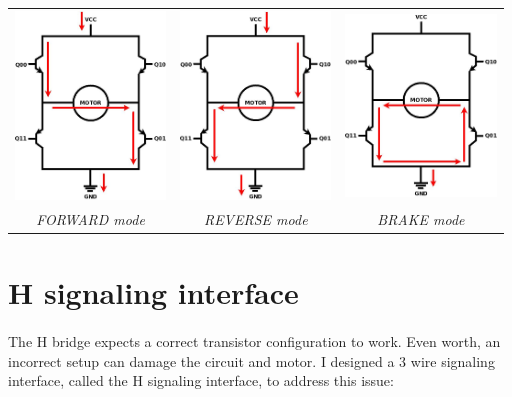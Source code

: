\documentclass[12pt]{article}
\begin{document}
\begin{center}
  \begin{tabular}{c|c|c}
    \includegraphics[keepaspectratio=true, width=40mm]{../pics/hbridge_forward.jpg} &
    \includegraphics[keepaspectratio=true, width=40mm]{../pics/hbridge_reverse.jpg} &
    \includegraphics[keepaspectratio=true, width=40mm]{../pics/hbridge_brake.jpg} \\
    \tiny{\textit{FORWARD mode}} & \tiny{\textit{REVERSE mode}} & \tiny{\textit{BRAKE mode}}
  \end{tabular}
\end{center}

\newpage
\section{H signaling interface}

\paragraph{} The H bridge expects a correct transistor configuration to work. Even worth, an incorrect setup can
damage the circuit and motor. I designed a 3 wire signaling interface, called the H signaling interface, to address
this issue:
\end{document}
